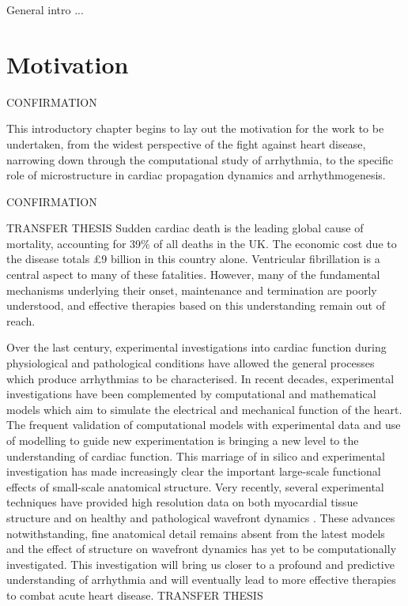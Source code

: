 
General intro ...

\section{Motivation}
\label{sec:intro:motivation}
CONFIRMATION

      This introductory chapter begins to lay out the motivation for the work to be undertaken, from the widest perspective of the fight against heart disease, narrowing down through the computational study of arrhythmia, to the specific role of microstructure in cardiac propagation dynamics and arrhythmogenesis.
      
CONFIRMATION

TRANSFER THESIS
  Sudden cardiac death is the leading global cause of mortality, accounting for 39\% of all deaths in the UK. The economic cost due to the disease totals \pounds9 billion in this country alone. Ventricular fibrillation is a central aspect to many of these fatalities. However, many of the fundamental mechanisms underlying their onset, maintenance and termination are poorly understood, and effective therapies based on this understanding remain out of reach.
  
  Over the last century, experimental investigations into cardiac function during physiological and pathological conditions have allowed the general processes which produce arrhythmias to be characterised. In recent decades, experimental investigations have been complemented by computational and mathematical models which aim to simulate the electrical and mechanical function of the heart. The frequent validation of computational models with experimental data and use of modelling to guide new experimentation is bringing a new level to the understanding of cardiac function. This marriage of in silico and experimental investigation has made increasingly clear the important large-scale functional effects of small-scale anatomical structure. Very recently, several experimental techniques have provided high resolution data on both myocardial tissue structure and on healthy and pathological wavefront dynamics \cite{Burton:2006p100,Plank:2009p440,Bishop:2009p940}. These advances notwithstanding, fine anatomical detail remains absent from the latest models and the effect of structure on wavefront dynamics has yet to be computationally investigated. This investigation will bring us closer to a profound and predictive understanding of arrhythmia and will eventually lead to more effective therapies to combat acute heart disease.
TRANSFER THESIS

